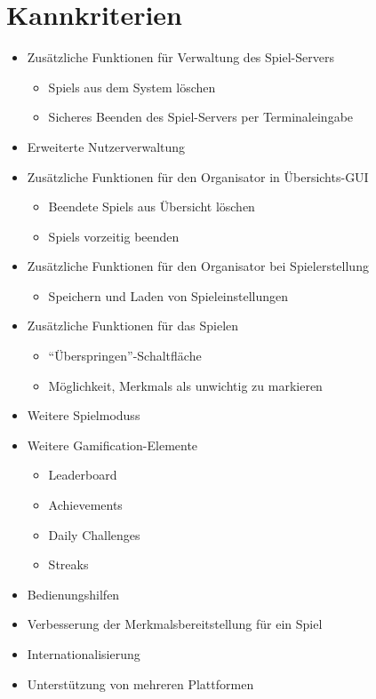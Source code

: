 \documentclass[a4paper]{scrreprt}
\begin{document}
    \section{Kannkriterien}
    \begin{itemize} %
    	\item Zusätzliche Funktionen für Verwaltung des \Gls{Spiel-Server}s
   	\begin{itemize}
            \item \Glspl{Spiel} aus dem System löschen
            \item Sicheres Beenden des \Gls{Spiel-Server}s per Terminaleingabe
        \end{itemize}
	\item Erweiterte Nutzerverwaltung
	\item Zusätzliche Funktionen für den \Gls{Organisator} in Übersichts-GUI
        \begin{itemize}
            \item Beendete \Glspl{Spiel} aus Übersicht löschen
            \item \Glspl{Spiel} vorzeitig beenden
        \end{itemize}
	\item Zusätzliche Funktionen für den \Gls{Organisator} bei Spielerstellung
        \begin{itemize}
            \item Speichern und Laden von \Gls{Spieleinstellungen}
        \end{itemize}
        \item Zusätzliche Funktionen für das Spielen 
        \begin{itemize}
            \item \enquote{Überspringen}-Schaltfläche 
            \item Möglichkeit, \Glspl{Merkmal} als unwichtig zu markieren 
        \end{itemize}
	\item Weitere \Glspl{Spielmodus}
	\item Weitere Gamification-Elemente
        \begin{itemize}
            \item Leaderboard %
            \item \Glspl{Achievement}
            \item Daily Challenges %
            \item Streaks %
        \end{itemize}
        \item Bedienungshilfen 
        \item Verbesserung der Merkmalsbereitstellung für ein \Gls{Spiel}
        \item Internationalisierung 
        \item Unterstützung von mehreren Plattformen
    \end{itemize}
\end{document}
